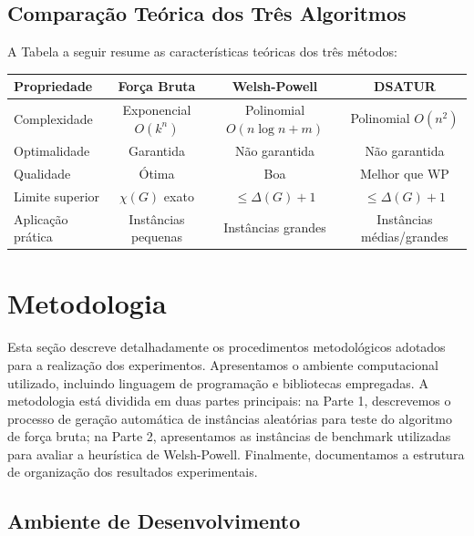 \documentclass[12pt]{article}
\begin{document}
\subsection{Comparação Teórica dos Três Algoritmos}

A Tabela a seguir resume as características teóricas dos três métodos:

\begin{table}[H]
    \centering
    \begin{tabular}{|l|c|c|c|}
    \hline
    \textbf{Propriedade} & \textbf{Força Bruta} & \textbf{Welsh-Powell} & \textbf{DSATUR} \\
    \hline
    Complexidade & Exponencial $O(k^n)$ & Polinomial $O(n \log n + m)$ & Polinomial $O(n^2)$ \\
    \hline
    Optimalidade & Garantida & Não garantida & Não garantida \\
    \hline
    Qualidade & Ótima & Boa & Melhor que WP \\
    \hline
    Limite superior & $\chi(G)$ exato & $\leq \Delta(G) + 1$ & $\leq \Delta(G) + 1$ \\
    \hline
    Aplicação prática & Instâncias pequenas & Instâncias grandes & Instâncias médias/grandes \\
    \hline
    \end{tabular}
\end{table}
\newpage
\section{Metodologia}

Esta seção descreve detalhadamente os procedimentos metodológicos adotados para a realização dos experimentos. Apresentamos o ambiente computacional utilizado, incluindo linguagem de programação e bibliotecas empregadas. A metodologia está dividida em duas partes principais: na Parte 1, descrevemos o processo de geração automática de instâncias aleatórias para teste do algoritmo de força bruta; na Parte 2, apresentamos as instâncias de benchmark utilizadas para avaliar a heurística de Welsh-Powell. Finalmente, documentamos a estrutura de organização dos resultados experimentais.

\subsection{Ambiente de Desenvolvimento}
\end{document}
